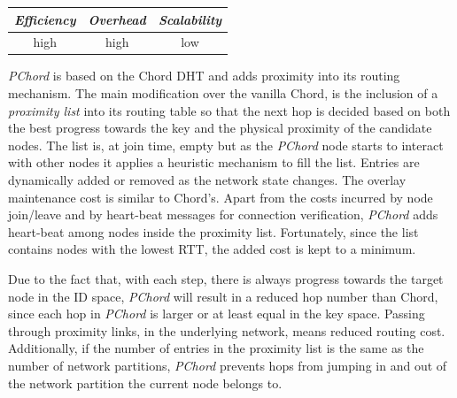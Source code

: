 \begin{center}
\begin{tabular}{ccc}
\emph{Efficiency} & \emph{Overhead} & \emph{Scalability} \\
\hline
high &
high &
low
\end{tabular}
\end{center}

\emph{PChord} \cite{HLYW2005} is based on the Chord DHT and adds
proximity into its routing mechanism. The main modification over the
vanilla Chord, is the inclusion of a \emph{proximity list} into its routing table
so that the next hop is decided based on both the best progress
towards the key and the physical proximity of the candidate nodes.
The list is, at join time, empty but as the \emph{PChord} node starts to interact with
other nodes it applies a heuristic mechanism to fill the list. Entries are
dynamically added or removed as the network state changes. The overlay
maintenance cost is similar to Chord's. Apart from the costs incurred by node
join/leave and by heart-beat messages for connection verification, \emph{PChord} adds
heart-beat among nodes inside the proximity list. Fortunately, since the list
contains nodes with the lowest RTT, the added cost is kept to a minimum.

Due to the fact that, with each step, there is always progress towards the
target node in the ID space, \emph{PChord} will result in a reduced hop number than
Chord, since each hop in \emph{PChord} is larger or at least equal in the key space.
Passing through proximity links, in the underlying network, means reduced routing
cost. Additionally, if the number of entries in the proximity list is the same
as the number of network partitions, \emph{PChord} prevents hops from jumping in and
out of the network partition the current node belongs to.

